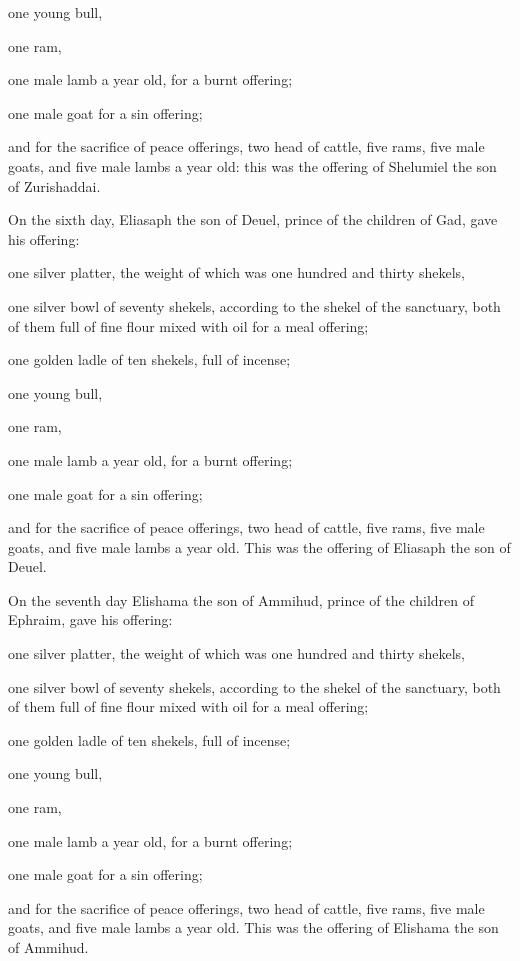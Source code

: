  one young bull,

one ram,

one male lamb a year old, for a burnt offering;

 one male goat for a sin offering;

 and for the sacrifice of peace offerings, two head of
cattle, five rams, five male goats, and five male lambs a year old: this
was the offering of Shelumiel the son of Zurishaddai.

 On the sixth day, Eliasaph the son of Deuel, prince of the
children of Gad,  gave his offering:

one silver platter, the weight of which was one hundred and thirty
shekels,

one silver bowl of seventy shekels, according to the shekel of the
sanctuary, both of them full of fine flour mixed with oil for a meal
offering;

 one golden ladle of ten shekels, full of incense;

 one young bull,

one ram,

one male lamb a year old, for a burnt offering;

 one male goat for a sin offering;

 and for the sacrifice of peace offerings, two head of
cattle, five rams, five male goats, and five male lambs a year old. This
was the offering of Eliasaph the son of Deuel.

 On the seventh day Elishama the son of Ammihud, prince of
the children of Ephraim,  gave his offering:

one silver platter, the weight of which was one hundred and thirty
shekels,

one silver bowl of seventy shekels, according to the shekel of the
sanctuary, both of them full of fine flour mixed with oil for a meal
offering;

 one golden ladle of ten shekels, full of incense;

 one young bull,

one ram,

one male lamb a year old, for a burnt offering;

 one male goat for a sin offering;

 and for the sacrifice of peace offerings, two head of
cattle, five rams, five male goats, and five male lambs a year old. This
was the offering of Elishama the son of Ammihud.


